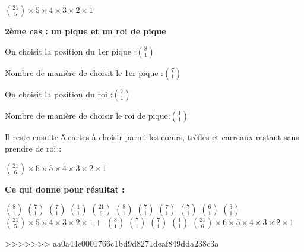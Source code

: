 \documentclass[a4paper,10pt]{article}
\begin{document}
\begin{enumerate}
\begin{enumerate}
		$\binom{21}{5}\times5\times 4\times 3 \times 2\times1$
		
		\textbf{2ème cas : un pique et un roi de pique}
		
		On choisit la position du 1er pique :$\binom{8}{1}$
		
		Nombre de manière de choisit le 1er pique :$\binom{7}{1}$
		
		On choisit la position du roi :$\binom{7}{1}$
		
		Nombre de manière de choisir le roi de pique:$\binom{1}{1}$
		
		Il reste ensuite 5 cartes à choisir parmi les cœurs, trèfles et carreaux restant 				sans prendre de roi :
		
		$\binom{21}{6}\times 6\times 5\times 4\times 3\times 2\times 1$
		
		\textbf{Ce qui donne pour résultat :}
		
		$\binom{8}{1}$
		$\binom{7}{1}$
		$\binom{7}{1}$
		$\binom{1}{1}$
		$\binom{21}{6}$		
		$\binom{8}{1}$
		$\binom{7}{1}$
		$\binom{7}{1}$
		$\binom{7}{1}$
		$\binom{6}{1}$
		$\binom{3}{1}$
		$\binom{21}{5}\times5\times 4\times 3 \times 2\times1+$
		$\binom{8}{1}$
		$\binom{7}{1}$
		$\binom{7}{1}$
		$\binom{1}{1}$
		$\binom{21}{6}\times 6\times 5\times 4\times 3\times 2\times 1$
	
		
>>>>>>> aa0a44e0001766c1bd9d8271deaf849dda238c3a
		\end{enumerate}
	\end{enumerate}
	
\end{document}
